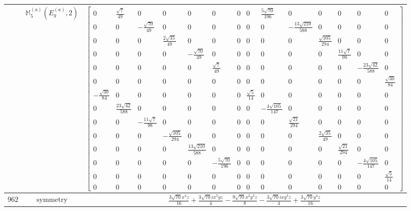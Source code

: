 \documentclass[fleqn,8pt,landscape]{jsarticle}
\begin{document}
\begin{longtable}{ccc}
$  $ & $ \mathbb{M}_{5}^{(a)}(E_{g}^{(a)},2) $ & $ \begin{bmatrix} 0 & \frac{\sqrt{7}}{49} & 0 & 0 & 0 & 0 & 0 & 0 & \frac{5 \sqrt{70}}{196} & 0 & 0 & 0 & 0 & 0 \\ 0 & 0 & - \frac{\sqrt{70}}{49} & 0 & 0 & 0 & 0 & 0 & 0 & - \frac{13 \sqrt{210}}{588} & 0 & 0 & 0 & 0 \\ 0 & 0 & 0 & \frac{2 \sqrt{35}}{49} & 0 & 0 & 0 & 0 & 0 & 0 & \frac{\sqrt{105}}{294} & 0 & 0 & 0 \\ 0 & 0 & 0 & 0 & - \frac{\sqrt{70}}{49} & 0 & 0 & 0 & 0 & 0 & 0 & \frac{11 \sqrt{7}}{98} & 0 & 0 \\ 0 & 0 & 0 & 0 & 0 & \frac{\sqrt{7}}{49} & 0 & 0 & 0 & 0 & 0 & 0 & - \frac{23 \sqrt{42}}{588} & 0 \\ 0 & 0 & 0 & 0 & 0 & 0 & 0 & 0 & 0 & 0 & 0 & 0 & 0 & \frac{\sqrt{30}}{84} \\ - \frac{\sqrt{30}}{84} & 0 & 0 & 0 & 0 & 0 & 0 & \frac{\sqrt{5}}{14} & 0 & 0 & 0 & 0 & 0 & 0 \\ 0 & \frac{23 \sqrt{42}}{588} & 0 & 0 & 0 & 0 & 0 & 0 & - \frac{4 \sqrt{105}}{147} & 0 & 0 & 0 & 0 & 0 \\ 0 & 0 & - \frac{11 \sqrt{7}}{98} & 0 & 0 & 0 & 0 & 0 & 0 & \frac{\sqrt{21}}{294} & 0 & 0 & 0 & 0 \\ 0 & 0 & 0 & - \frac{\sqrt{105}}{294} & 0 & 0 & 0 & 0 & 0 & 0 & \frac{2 \sqrt{35}}{49} & 0 & 0 & 0 \\ 0 & 0 & 0 & 0 & \frac{13 \sqrt{210}}{588} & 0 & 0 & 0 & 0 & 0 & 0 & \frac{\sqrt{21}}{294} & 0 & 0 \\ 0 & 0 & 0 & 0 & 0 & - \frac{5 \sqrt{70}}{196} & 0 & 0 & 0 & 0 & 0 & 0 & - \frac{4 \sqrt{105}}{147} & 0 \\ 0 & 0 & 0 & 0 & 0 & 0 & 0 & 0 & 0 & 0 & 0 & 0 & 0 & \frac{\sqrt{5}}{14} \\ 0 & 0 & 0 & 0 & 0 & 0 & 0 & 0 & 0 & 0 & 0 & 0 & 0 & 0 \end{bmatrix} $ \\ \hline
$ 962 $ & $ \text{symmetry} $ & $ \frac{3 \sqrt{70} x^{4} z}{16} + \frac{3 \sqrt{70} i x^{3} y z}{4} - \frac{9 \sqrt{70} x^{2} y^{2} z}{8} - \frac{3 \sqrt{70} i x y^{3} z}{4} + \frac{3 \sqrt{70} y^{4} z}{16} $ \\

\end{longtable}
\end{document}
